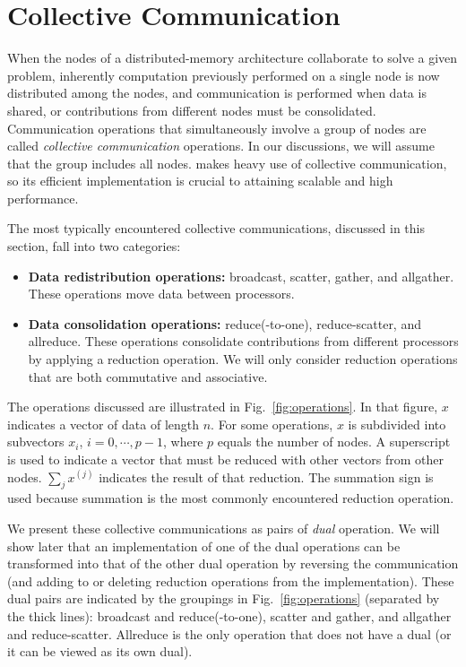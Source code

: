 \chapter{Collective Communication}
\label{chapter:coll}




When the nodes of a distributed-memory architecture collaborate
to solve a given problem, inherently computation previously
performed on a single node is now distributed among the nodes,
and communication is performed when data is shared, or contributions from
different nodes must be consolidated.
Communication operations that simultaneously involve a group of nodes
are called {\em collective communication} operations.
In our discussions, we will assume that the group includes all nodes.
\plapack makes heavy use of collective communication,
so its efficient implementation is crucial to attaining 
scalable and high performance.

The most typically encountered collective communications, discussed
in this section, fall into two categories:
\begin{itemize}
\item
{\bf Data redistribution operations:}
broadcast, scatter, gather, and allgather.
These operations move data between processors.
\item
{\bf Data consolidation operations:}
reduce(-to-one), reduce-scatter, and allreduce.
These operations consolidate contributions from different processors
by applying a reduction operation.
We will only consider reduction operations that are both commutative
and associative.
\end{itemize}
The operations discussed are illustrated in Fig.~\ref{fig:operations}.
In that figure, $ x $ indicates a vector of data of length $ n $.
For some operations, $ x $ is subdivided into subvectors
$ x_i $, $ i = 0, \cdots, p-1 $, where $ p $ equals the number of nodes.
A superscript is used to indicate a vector that must be reduced
with other vectors from other nodes.  $ \sum_{j} x^{(j)} $ indicates the
result of that reduction.
The summation sign is used because summation is the
most commonly encountered reduction operation.

We present these collective communications as pairs of
{\em dual} operation.  We will show later that an implementation
of one of the dual operations can be transformed into that of the other dual
operation by reversing the communication (and adding to or deleting
reduction operations from the implementation).  These dual pairs are indicated
by the groupings in Fig.~\ref{fig:operations} (separated by the thick lines):
{broadcast and reduce(-to-one)},
{scatter and gather}, and
{allgather and reduce-scatter}.
{Allreduce} is the only operation that does not have a dual
(or it can be viewed as its own dual).
